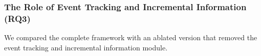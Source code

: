 \documentclass[sigconf, nonacm]{acmart} %
\begin{document}

\subsubsection{The Role of Event Tracking and Incremental Information (RQ3)}

We compared the complete framework with an ablated version that removed the event tracking and incremental information module.
\end{document}
